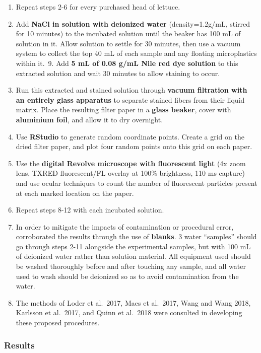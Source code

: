 \documentclass[]{article}
\begin{document}
\begin{enumerate}
\item
  Repeat steps 2-6 for every purchased head of lettuce.~
\item
  Add \textbf{NaCl in solution with deionized water} (density=1.2g/mL,
  stirred for 10 minutes) to the incubated solution until the beaker has
  100 mL of solution in it. Allow solution to settle for 30 minutes,
  then use a vacuum system to collect the top 40 mL of each sample and
  any floating microplastics within it.~9. Add \textbf{5 mL of 0.08 g/mL
  Nile red dye solution} to this extracted solution and wait 30 minutes
  to allow staining to occur.~
\item
  Run this extracted and stained solution through \textbf{vacuum
  filtration with an entirely glass apparatus} to separate stained
  fibers from their liquid matrix. Place the resulting filter paper in a
  \textbf{glass beaker}, cover with \textbf{aluminium foil}, and allow
  it to dry overnight.~
\item
  Use \textbf{RStudio} to generate random coordinate points. Create a
  grid on the dried filter paper, and plot four random points onto this
  grid on each paper.~
\item
  Use the \textbf{digital Revolve microscope with fluorescent light} (4x
  zoom lens, TXRED fluorescent/FL overlay at 100\% brightness, 110 ms
  capture) and use ocular techniques to count the number of fluorescent
  particles present at each marked location on the paper.~
\item
  Repeat steps 8-12 with each incubated solution.~
\item
  In order to mitigate the impacts of contamination or procedural error,
  corroborated the results through the use of \textbf{blanks}. 3 water
  ``samples'' should go through steps 2-11 alongside the experimental
  samples, but with 100 mL of deionized water rather than solution
  material. All equipment used should be washed thoroughly before and
  after touching any sample, and all water used to wash should be
  deionized so as to avoid contamination from the water.~
\item
  The methods of Loder et al.~2017, Maes et al.~2017, Wang and Wang
  2018, Karlsson et al.~2017, and Quinn et al.~2018 were consulted in
  developing these proposed procedures.
\end{enumerate}

\hypertarget{results}{%
\subsubsection{Results}\label{results}}
\end{document}
